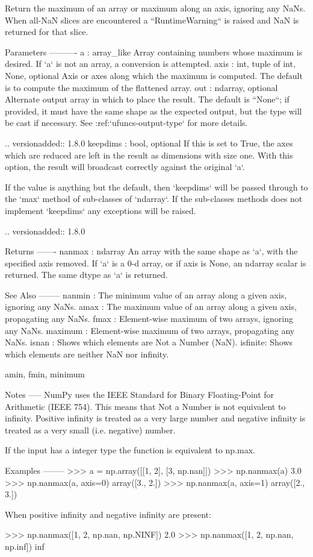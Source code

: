 \begin{DoxyVerb}Return the maximum of an array or maximum along an axis, ignoring any
NaNs.  When all-NaN slices are encountered a ``RuntimeWarning`` is
raised and NaN is returned for that slice.

Parameters
----------
a : array_like
    Array containing numbers whose maximum is desired. If `a` is not an
    array, a conversion is attempted.
axis : {int, tuple of int, None}, optional
    Axis or axes along which the maximum is computed. The default is to compute
    the maximum of the flattened array.
out : ndarray, optional
    Alternate output array in which to place the result.  The default
    is ``None``; if provided, it must have the same shape as the
    expected output, but the type will be cast if necessary. See
    :ref:`ufuncs-output-type` for more details.

    .. versionadded:: 1.8.0
keepdims : bool, optional
    If this is set to True, the axes which are reduced are left
    in the result as dimensions with size one. With this option,
    the result will broadcast correctly against the original `a`.

    If the value is anything but the default, then
    `keepdims` will be passed through to the `max` method
    of sub-classes of `ndarray`.  If the sub-classes methods
    does not implement `keepdims` any exceptions will be raised.

    .. versionadded:: 1.8.0

Returns
-------
nanmax : ndarray
    An array with the same shape as `a`, with the specified axis removed.
    If `a` is a 0-d array, or if axis is None, an ndarray scalar is
    returned.  The same dtype as `a` is returned.

See Also
--------
nanmin :
    The minimum value of an array along a given axis, ignoring any NaNs.
amax :
    The maximum value of an array along a given axis, propagating any NaNs.
fmax :
    Element-wise maximum of two arrays, ignoring any NaNs.
maximum :
    Element-wise maximum of two arrays, propagating any NaNs.
isnan :
    Shows which elements are Not a Number (NaN).
isfinite:
    Shows which elements are neither NaN nor infinity.

amin, fmin, minimum

Notes
-----
NumPy uses the IEEE Standard for Binary Floating-Point for Arithmetic
(IEEE 754). This means that Not a Number is not equivalent to infinity.
Positive infinity is treated as a very large number and negative
infinity is treated as a very small (i.e. negative) number.

If the input has a integer type the function is equivalent to np.max.

Examples
--------
>>> a = np.array([[1, 2], [3, np.nan]])
>>> np.nanmax(a)
3.0
>>> np.nanmax(a, axis=0)
array([3.,  2.])
>>> np.nanmax(a, axis=1)
array([2.,  3.])

When positive infinity and negative infinity are present:

>>> np.nanmax([1, 2, np.nan, np.NINF])
2.0
>>> np.nanmax([1, 2, np.nan, np.inf])
inf\end{DoxyVerb}
